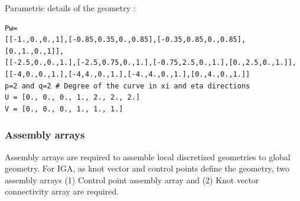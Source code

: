 \documentclass[11pt]{article}
\begin{document}
Parametric details of the geometry \cite{agrawal2019iga}:
\begin{verbatim}
Pw=
[[-1.,0.,0.,1],[-0.85,0.35,0.,0.85],[-0.35,0.85,0.,0.85],[0.,1.,0.,1]],
[[-2.5,0.,0.,1.],[-2.5,0.75,0.,1.],[-0.75,2.5,0.,1.],[0.,2.5,0.,1.]],
[[-4,0.,0.,1.],[-4,4.,0.,1.],[-4.,4.,0.,1.],[0.,4.,0.,1.]]
p=2 and q=2 # Degree of the curve in xi and eta directions
U = [0., 0., 0., 1., 2., 2., 2.]
V = [0., 0., 0., 1., 1., 1.]
\end{verbatim}


 

\subsubsection{Assembly arrays} \label{AssemblyArrays}
Assembly arrays are required to assemble local discretized geometries to global geometry. For IGA, as knot vector and control points define the geometry, two assembly arrays (1) Control point assembly array and (2) Knot vector connectivity array are required.
\end{document}
